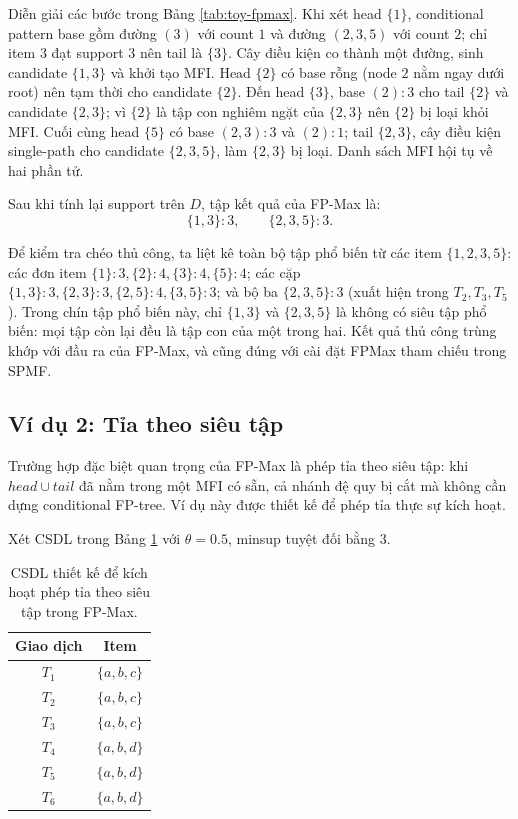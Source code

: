 Diễn giải các bước trong Bảng \ref{tab:toy-fpmax}. Khi xét head $\{1\}$, conditional pattern base gồm đường $(3)$ với count $1$ và đường $(2,3,5)$ với count $2$; chỉ item $3$ đạt support $3$ nên tail là $\{3\}$. Cây điều kiện co thành một đường, sinh candidate $\{1,3\}$ và khởi tạo MFI. Head $\{2\}$ có base rỗng (node $2$ nằm ngay dưới root) nên tạm thời cho candidate $\{2\}$. Đến head $\{3\}$, base $(2):3$ cho tail $\{2\}$ và candidate $\{2,3\}$; vì $\{2\}$ là tập con nghiêm ngặt của $\{2,3\}$ nên $\{2\}$ bị loại khỏi MFI. Cuối cùng head $\{5\}$ có base $(2,3):3$ và $(2):1$; tail $\{2,3\}$, cây điều kiện single-path cho candidate $\{2,3,5\}$, làm $\{2,3\}$ bị loại. Danh sách MFI hội tụ về hai phần tử.

Sau khi tính lại support trên $D$, tập kết quả của FP-Max là:
\[
    \{1,3\}:3, \qquad \{2,3,5\}:3.
\]

Để kiểm tra chéo thủ công, ta liệt kê toàn bộ tập phổ biến từ các item $\{1,2,3,5\}$: các đơn item $\{1\}:3,\{2\}:4,\{3\}:4,\{5\}:4$; các cặp $\{1,3\}:3,\{2,3\}:3,\{2,5\}:4,\{3,5\}:3$; và bộ ba $\{2,3,5\}:3$ (xuất hiện trong $T_2,T_3,T_5$). Trong chín tập phổ biến này, chỉ $\{1,3\}$ và $\{2,3,5\}$ là không có siêu tập phổ biến: mọi tập còn lại đều là tập con của một trong hai. Kết quả thủ công trùng khớp với đầu ra của FP-Max, và cũng đúng với cài đặt FPMax tham chiếu trong SPMF.

\subsection{Ví dụ 2: Tỉa theo siêu tập}

Trường hợp đặc biệt quan trọng của FP-Max là phép tỉa theo siêu tập: khi $head \cup tail$ đã nằm trong một MFI có sẵn, cả nhánh đệ quy bị cắt mà không cần dựng conditional FP-tree. Ví dụ này được thiết kế để phép tỉa thực sự kích hoạt.

Xét CSDL trong Bảng \ref{tab:prune-db} với $\theta = 0.5$, minsup tuyệt đối bằng 3.

\begin{table}[H]
    \centering
    \caption{CSDL thiết kế để kích hoạt phép tỉa theo siêu tập trong FP-Max.}
    \label{tab:prune-db}
    \begin{tabular}{c c}
        \toprule
        Giao dịch & Item \\
        \midrule
        $T_1$ & $\{a,b,c\}$ \\
        $T_2$ & $\{a,b,c\}$ \\
        $T_3$ & $\{a,b,c\}$ \\
        $T_4$ & $\{a,b,d\}$ \\
        $T_5$ & $\{a,b,d\}$ \\
        $T_6$ & $\{a,b,d\}$ \\
        \bottomrule
    \end{tabular}
\end{table}

